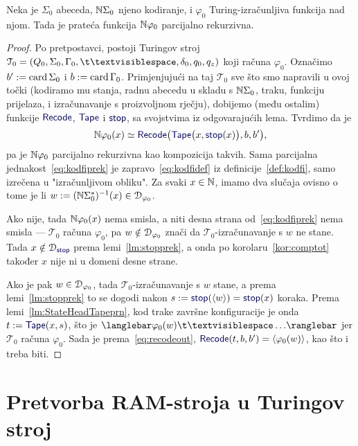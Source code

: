 \begin{teorem}[{name=[parcijalna rekurzivnost pratećih Turing-izračunljivih funkcija]}]\label{tm:tikp}
Neka je $\Sigma_0$ abeceda, ${\mathbb N}\Sigma_0$ njeno kodiranje, i $\varphi_0$ Turing-izračunljiva funkcija nad njom. Tada je prateća funkcija ${\mathbb N}\varphi_0$ parcijalno rekurzivna.
\end{teorem}
\begin{proof}
Po pretpostavci, postoji Turingov stroj $\mathcal T_0=(Q_0,\Sigma_0,\Gamma_0,\bl,\delta_0,q_0,q_z)$ koji računa $\varphi_0$. Označimo $b':=\operatorname{card}\Sigma_0$ i $b:=\operatorname{card}\Gamma_0$. Primjenjujući na taj $\mathcal T_0$ sve što smo napravili u ovoj točki (kodiramo mu stanja, radnu abecedu u skladu s ${\mathbb N}\Sigma_0$, traku, funkciju prijelaza, i izračunavanje s proizvoljnom rječju), dobijemo (među ostalim) funkcije $\f{Recode}$, $\f{Tape}$ i $\f{stop}$, sa svojstvima iz odgovarajućih lema. Tvrdimo da je
\begin{equation}\label{eq:kodfiprek}
    \N\varphi_0(x)\simeq
    \f{Recode}\bigl(\f{Tape}\bigl(x,\f{stop}(x)\bigr),b,b'\bigr)\text,
\end{equation}
pa je ${\mathbb N}\varphi_0$ parcijalno rekurzivna kao kompozicija takvih. Sama parcijalna jednakost~\eqref{eq:kodfiprek} je zapravo~\eqref{eq:kodfidef} iz definicije~\ref{def:kodfi}, samo izrečena u "izračunljivom obliku". Za svaki $x\in{\mathbb N}$, imamo dva slučaja ovisno o tome je li $w:=({\mathbb N}\Sigma_0^*)^{-1}(x)\in\mathcal D_{\varphi_0}$.

Ako nije, tada ${\mathbb N}\varphi_0(x)$ nema smisla, a niti desna strana od~\eqref{eq:kodfiprek} nema smisla --- $\mathcal T_0$ računa $\varphi_0$, pa $w\notin\mathcal D_{\varphi_0}$ znači da $\mathcal T_0$-izračunavanje s $w$ ne stane. Tada $x\notin\dom{\f{stop}}$ prema lemi~\ref{lm:stopprek}, a onda po korolaru~\ref{kor:comptot} također $x$ nije ni u domeni desne strane.

Ako je pak $w\in\mathcal D_{\varphi_0}$, tada $\mathcal T_0$-izračunavanje s $w$ stane, a prema lemi~\ref{lm:stopprek} to se dogodi nakon $s:=\f{stop}(\kr w)=\f{stop}(x)$ koraka. Prema lemi~\ref{lm:StateHeadTapeprn}, kod trake završne konfiguracije je onda $t:=\f{Tape}(x,s)$, što je $\knk{\varphi_0(w)\bl\ldots}$ jer $\mathcal T_0$ računa $\varphi_0$. Sada je prema~\eqref{eq:recodeout}, $\f{Recode}(t,b,b')=\kr{\varphi_0(w)}$, kao što i treba biti.
\end{proof}

\section{Pretvorba RAM-stroja u Turingov stroj}\label{sec:RAM>Turing}

